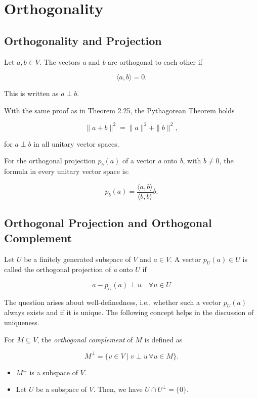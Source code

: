 \newpage
\section{Orthogonality}

\subsection{Orthogonality and Projection}

Let \( a, b \in V \). The vectors \emph{a} and \emph{b} are orthogonal to each other if

\[
    \langle a, b \rangle = 0.
\]

This is written as \( a \perp b \).
\vspace{\baselineskip}

With the same proof as in Theorem 2.25, the Pythagorean Theorem holds

\[
    \|a + b\|^2 = \|a\|^2 + \|b\|^2,
\]

for \( a \perp b \) in all unitary vector spaces.
\vspace{\baselineskip}

For the orthogonal projection \( p_b(a) \) of a vector \emph{a} onto \emph{b}, with \( b \neq 0 \), the 
formula in every unitary vector space is:

\[
    p_b(a) = \frac{\langle a, b \rangle}{\langle b, b \rangle} b.
\]

\subsection{Orthogonal Projection and Orthogonal Complement}

Let \( U \) be a finitely generated subspace of \( V \) and \( a \in V \). A vector 
\( p_U(a) \in U \) is called the orthogonal projection of \emph{a} onto \( U \) if

\[
    a - p_U(a) \perp u \quad \forall u \in U
\]

The question arises about well-definedness, i.e., whether such a vector \( p_U(a) \) always exists and 
if it is unique. The following concept helps in the discussion of uniqueness.
\vspace{\baselineskip}

For \( M \subseteq V \), the \emph{orthogonal complement} of \( M \) is defined as

\[
    M^\perp = \{ v \in V \mid v \perp u \, \forall u \in M \}.
\]

\begin{itemize}
    \item \( M^\perp \) is a subspace of \( V \).
    \item Let \( U \) be a subspace of \( V \). Then, we have \( U \cap U^\perp = \{0\} \).
\end{itemize}

